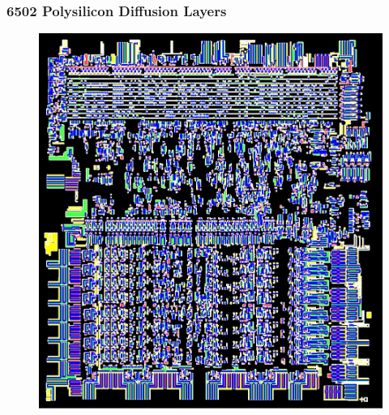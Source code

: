 \documentclass{beamer}
\begin{document}
\begin{frame}
\frametitle{6502 Polysilicon Diffusion Layers}
\begin{figure}
\centering
\includegraphics[scale=0.2]{images/polylayers.png}
\end{figure}
\end{frame}
\end{document}
